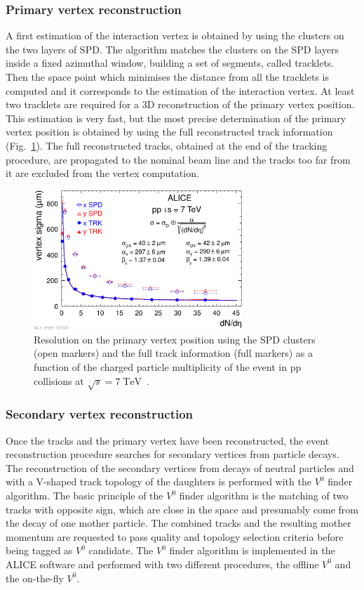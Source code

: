 \subsubsection{Primary vertex reconstruction}
A first estimation of the interaction vertex is obtained by using the clusters on the two layers of 
SPD. The algorithm matches the clusters on the SPD layers inside a fixed azimuthal window,
building a set of segments, called tracklets.
Then the space point which minimises the distance from all the tracklets is computed and it corresponds to the estimation of
the interaction vertex.
At least two tracklets are required for a 3D reconstruction of the primary vertex position.
This estimation is very fast, but the most precise determination of the primary vertex position is 
obtained by using the full reconstructed track information (Fig.~\ref{fig:vertres}).
The full reconstructed tracks, obtained at the end of the tracking procedure, are propagated to the
nominal beam line and the tracks too far from it are excluded from the vertex computation.

\begin{figure}
    \centering
    \includegraphics[width=0.7\textwidth]{gfx/vertexres}
	\caption{Resolution on the primary vertex position using the SPD clusters (open markers) and the full track information (full markers) as a function of the charged particle multiplicity of the event in pp collisions at $\sqrt{s} = 7\; \mathrm{TeV}$~\cite{alicemulti}.}
	\label{fig:vertres}
\end{figure}

\subsubsection{Secondary vertex reconstruction}
Once the tracks and the primary vertex have been reconstructed, the event reconstruction procedure
searches for secondary vertices from particle decays.
The reconstruction of the secondary vertices from decays of neutral particles and with a V-shaped 
track topology of the daughters is performed with the $V^{0}$ finder algorithm.
The basic principle of the $V^{0}$ finder algorithm is the matching of two tracks with opposite sign,
which are close in the space and presumably come from the decay of one mother particle.
The combined tracks and the resulting mother momentum are requested to pass quality and topology
selection criteria before being tagged as $V^{0}$ candidate.
The $V^{0}$ finder algorithm is implemented in the ALICE software and performed with two different
procedures, the offline $V^{0}$ and the on-the-fly $V^{0}$.

